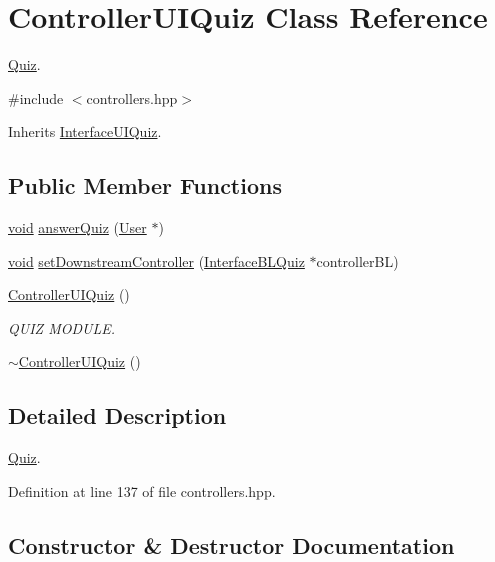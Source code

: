 \hypertarget{class_controller_u_i_quiz}{}\section{Controller\+U\+I\+Quiz Class Reference}
\label{class_controller_u_i_quiz}


\hyperlink{class_quiz}{Quiz}.  




{\ttfamily \#include $<$controllers.\+hpp$>$}



Inherits \hyperlink{class_interface_u_i_quiz}{Interface\+U\+I\+Quiz}.

\subsection*{Public Member Functions}
\begin{DoxyCompactItemize}
\item 
\hyperlink{class_interface_u_i_quiz_a8a3301246ca34b00553527afef00eb23}{void} \hyperlink{class_controller_u_i_quiz_a284e57b6ddb5546f737e4be6b5bbee24}{answer\+Quiz} (\hyperlink{class_user}{User} $\ast$)
\item 
\hyperlink{class_interface_u_i_quiz_a8a3301246ca34b00553527afef00eb23}{void} \hyperlink{class_controller_u_i_quiz_a17083c1071e7bee3a1d4c0515d433907}{set\+Downstream\+Controller} (\hyperlink{class_interface_b_l_quiz}{Interface\+B\+L\+Quiz} $\ast$controller\+BL)
\item 
\hyperlink{class_controller_u_i_quiz_a374dc710ffe741c232f57301231ace94}{Controller\+U\+I\+Quiz} ()
\begin{DoxyCompactList}\small\item\em Q\+U\+IZ M\+O\+D\+U\+LE. \end{DoxyCompactList}\item 
\hyperlink{class_controller_u_i_quiz_a9658d952317cfa8da8d307e363877c09}{$\sim$\+Controller\+U\+I\+Quiz} ()
\end{DoxyCompactItemize}


\subsection{Detailed Description}
\hyperlink{class_quiz}{Quiz}. 

Definition at line 137 of file controllers.\+hpp.



\subsection{Constructor \& Destructor Documentation}
\mbox{\label{class_controller_u_i_quiz_a374dc710ffe741c232f57301231ace94}} 
